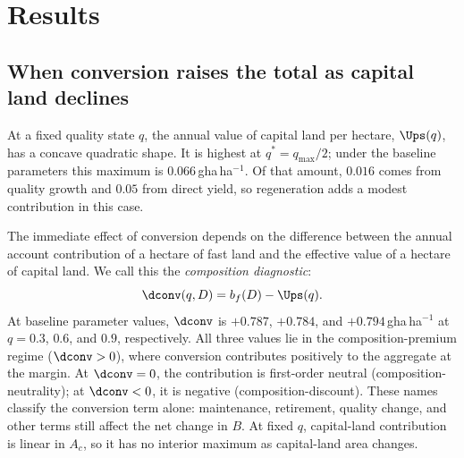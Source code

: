 \section{Results}\label{sec:results}

\subsection{When conversion raises the total as capital land declines}\label{sec:mask}

At a fixed quality state $q$, the annual value of capital land per hectare, $\Ups(q)$, has a concave quadratic shape. It is highest at $q^*=q_{\max}/2$; under the baseline parameters this maximum is $0.066$\,gha\,ha$^{-1}$. Of that amount, $0.016$ comes from quality growth and $0.05$ from direct yield, so regeneration adds a modest contribution in this case.

The immediate effect of conversion depends on the difference between the annual account contribution of a hectare of fast land and the effective value of a hectare of capital land. We call this the \emph{composition diagnostic}:
\begin{equation}\label{eq:dconv}
\dconv(q,D)=b_f(D)-\Ups(q).
\end{equation}
At baseline parameter values, $\dconv$ is $+0.787$, $+0.784$, and $+0.794$\,gha\,ha$^{-1}$ at $q=0.3$, $0.6$, and $0.9$, respectively. All three values lie in the composition-premium regime ($\dconv>0$), where conversion contributes positively to the aggregate at the margin. At $\dconv=0$, the contribution is first-order neutral (composition-neutrality); at $\dconv<0$, it is negative (composition-discount). These names classify the conversion term alone: maintenance, retirement, quality change, and other terms still affect the net change in $B$. At fixed $q$, capital-land contribution is linear in $A_c$, so it has no interior maximum as capital-land area changes.

